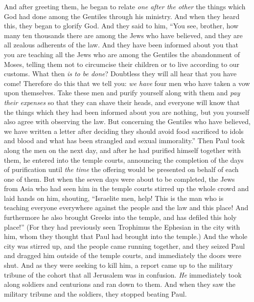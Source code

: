 \begin{biblechapter}
\verse And after greeting them, he began to relate \textit{one after the other} the things which God had done among the Gentiles through his ministry.
\verse And when they heard this, they began to glorify God. And they said to him, “You see, brother, how many ten thousands there are among the Jews who have believed, and they are all zealous adherents of the law.
\verse And they have been informed about you that you are teaching all the Jews who are among the Gentiles the abandonment of Moses, telling them not to circumcise their children or to live according to our customs.
\verse What then \textit{is to be done}? Doubtless they will all hear that you have come!
\verse Therefore do this that we tell you: \textit{we have} four men who have taken a vow upon themselves.
\verse Take these men and purify yourself along with them and \textit{pay their expenses} so that they can shave their heads, and everyone will know that the things which they had been informed about you are nothing, but you yourself also agree with observing the law.
\verse But concerning the Gentiles who have believed, we have written a letter after deciding they should avoid food sacrificed to idols and blood and what has been strangled and sexual immorality.”
\verse Then Paul took along the men on the next day, and after he had purified himself together with them, he entered into the temple courts, announcing the completion of the days of purification until \textit{the time} the offering would be presented on behalf of each one of them.
 But when the seven days were about to be completed, the Jews from Asia who had seen him in the temple courts stirred up the whole crowd and laid hands on him,
\verse shouting, “Israelite men, help! This is the man who is teaching everyone everywhere against the people and the law and this place! And furthermore he also brought Greeks into the temple, and has defiled this holy place!”
\verse (For they had previously seen Trophimus the Ephesian in the city with him, whom they thought that Paul had brought into the temple.)
\verse And the whole city was stirred up, and the people came running together, and they seized Paul and dragged him outside of the temple courts, and immediately the doors were shut.
\verse And as they were seeking to kill him, a report came up to the military tribune of the cohort that all Jerusalem was in confusion.
\verse \textit{He} immediately took along soldiers and centurions and ran down to them. And when they saw the military tribune and the soldiers, they stopped beating Paul.

\end{biblechapter}
